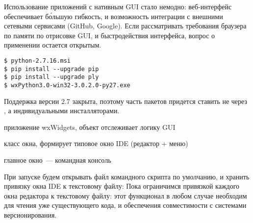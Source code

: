 \label{wx}\secdown

\noindent
Использование приложений с нативным GUI стало немодно: веб-интер\-фейс
обеспечивает б\'{о}льшую гибкость, и возможность
интеграции с внешними сетевыми сервисами (GitHub, Google). Если рассматривать
требования браузера по памяти по отрисовке GUI, и быстродействия интерфейса,
вопрос о применении  остается открытым.


\begin{verbatim}
$ python-2.7.16.msi
$ pip install --upgrade pip
$ pip install --upgrade ply
$ wxPython3.0-win32-3.0.2.0-py27.exe
\end{verbatim}

\noindent
Поддержка версии 2.7 закрыта, поэтому часть пакетов придется ставить не через
, а индивидуальными инсталляторами.


\clearpage
{}

\begin{description}[nosep]
\item[ide] приложение wxWidgets, объект отслеживает логику GUI
\item[ideWindow] класс окна, формирует типовое окно IDE (редактор + меню)
\item[ideConsole] главное окно\ --- командная консоль
\end{description}



\clearpage
{}

\clearpage
При запуске будем открывать файл командного скрипта по умолчанию, и хранить
привязку окна IDE к текстовому файлу:
Пока ограничимся привязкой каждого окна редактора к текстовому файлу: этот
функционал в любом случае необходим для чтения уже существующего кода, и
обеспечения совместимости с системами версионирования.
\clearpage
{}



\secup